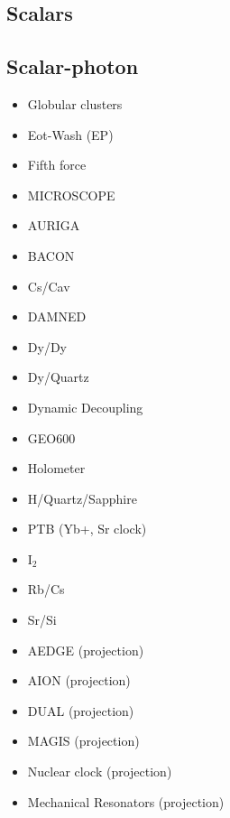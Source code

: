 \documentclass[9pt,twocolumn]{extarticle}
\begin{document}
\begin{mdframed}
\vspace{-1em}
\section{Scalars}\vspace{-0.5em}

\subsection*{Scalar-photon}\vspace{-0.5em}
\begin{itemize}\setlength\itemsep{-0.5em}
	\item Globular clusters~\cite{Dolan:2022kul}
	\item Eot-Wash (EP)~\cite{Hees:2018fpg}
	\item Fifth force~\cite{Arvanitaki:2015iga}
	\item MICROSCOPE~\cite{Berge:2017ovy}
	\item AURIGA~\cite{Branca:2016rez}
	\item BACON~\cite{BACON}
	\item Cs/Cav~\cite{Tretiak:2022ndx}
	\item DAMNED~\cite{Savalle:2020vgz}
	\item Dy/Dy~\cite{VanTilburg:2015oza}
	\item Dy/Quartz~\cite{Zhang:2022ewz}
	\item Dynamic Decoupling~\cite{Aharony:2019iad}
	\item GEO600~\cite{Vermeulen:2021epa}
	\item Holometer~\cite{Aiello:2021wlp}
	\item H/Quartz/Sapphire~\cite{Campbell:2020fvq}
	\item PTB (Yb+, Sr clock)~\cite{Filzinger:2023zrs}
	\item I$_2$~\cite{Oswald:2021vtc}
	\item Rb/Cs~\cite{Hees:2016gop}
	\item Sr/Si~\cite{Kennedy:2020bac}
	\item AEDGE (projection)~\cite{Badurina:2021rgt}
	\item AION (projection)~\cite{Badurina:2021rgt}
	\item DUAL (projection)~\cite{Arvanitaki:2015iga}
	\item MAGIS (projection)~\cite{MAGIS}
	\item Nuclear clock (projection)~\cite{Antypas:2022asj}
	\item Mechanical Resonators (projection)~\cite{Manley:2019vxy}
\end{itemize}
\vspace{-2em}


\end{mdframed}
\end{document}
